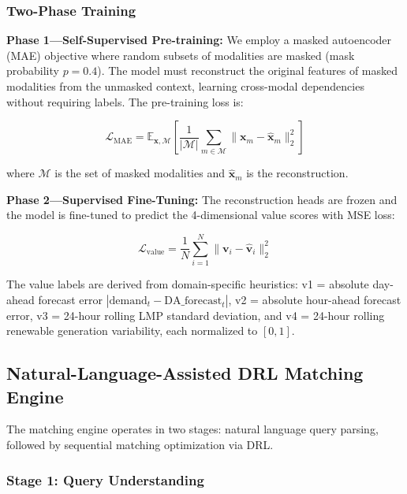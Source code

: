 \documentclass{ieeeaccess}
\begin{document}
\subsubsection{Two-Phase Training}

\textbf{Phase 1---Self-Supervised Pre-training:} We employ a masked autoencoder (MAE) objective where random subsets of modalities are masked (mask probability $p=0.4$). The model must reconstruct the original features of masked modalities from the unmasked context, learning cross-modal dependencies without requiring labels. The pre-training loss is:

\begin{equation}
\mathcal{L}_{\text{MAE}} = \mathbb{E}_{\mathbf{x}, \mathcal{M}} \left[ \frac{1}{|\mathcal{M}|} \sum_{m \in \mathcal{M}} \| \mathbf{x}_m - \hat{\mathbf{x}}_m \|_2^2 \right]
\label{eq:mae}
\end{equation}

where $\mathcal{M}$ is the set of masked modalities and $\hat{\mathbf{x}}_m$ is the reconstruction.

\textbf{Phase 2---Supervised Fine-Tuning:} The reconstruction heads are frozen and the model is fine-tuned to predict the 4-dimensional value scores with MSE loss:

\begin{equation}
\mathcal{L}_{\text{value}} = \frac{1}{N} \sum_{i=1}^N \| \mathbf{v}_i - \hat{\mathbf{v}}_i \|_2^2
\label{eq:value_loss}
\end{equation}

The value labels are derived from domain-specific heuristics: v1 = absolute day-ahead forecast error $|\text{demand}_{t} - \text{DA\_forecast}_{t}|$, v2 = absolute hour-ahead forecast error, v3 = 24-hour rolling LMP standard deviation, and v4 = 24-hour rolling renewable generation variability, each normalized to $[0, 1]$.

\subsection{Natural-Language-Assisted DRL Matching Engine}
\label{sec:matching}

The matching engine operates in two stages: natural language query parsing, followed by sequential matching optimization via DRL.

\subsubsection{Stage 1: Query Understanding}
\end{document}
